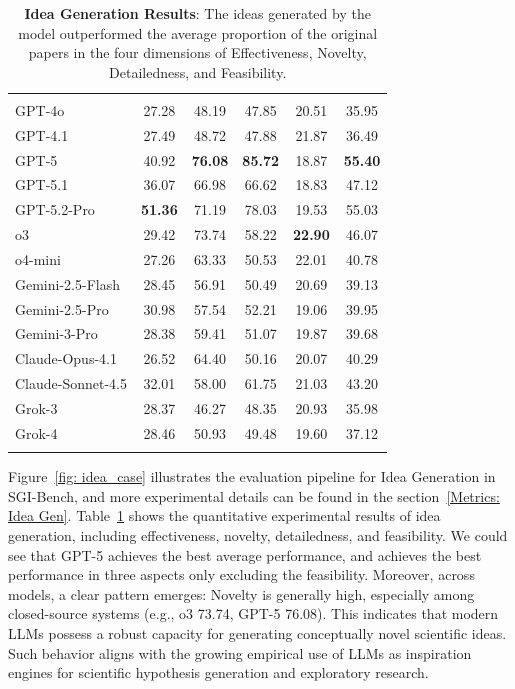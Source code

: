 \begin{table}[t]
{\begin{tabular}{lccccc}
\rowcolor{blue!5}\multicolumn{6}{c}{\emph{Closed-source LLM}} \\ \arrayrulecolor{black!30}\midrule
GPT-4o & 27.28 & 48.19 & 47.85 & 20.51 & 35.95 \\
GPT-4.1 & 27.49 & 48.72 & 47.88 & 21.87 & 36.49 \\
GPT-5 & 40.92 & \cellcolor{blue!10}\textbf{76.08} & \cellcolor{blue!10}\textbf{85.72} & 18.87 & \cellcolor{blue!10}\textbf{55.40} \\
GPT-5.1 & 36.07 & 66.98 & 66.62 & 18.83 & 47.12 \\
GPT-5.2-Pro & \cellcolor{blue!10}\textbf{51.36} & 71.19 & 78.03 & 19.53 & 55.03 \\
o3 & 29.42 & 73.74 & 58.22 & \cellcolor{blue!10}\textbf{22.90} & 46.07 \\
o4-mini & 27.26 & 63.33 & 50.53 & 22.01 & 40.78 \\
Gemini-2.5-Flash & 28.45 & 56.91 & 50.49 & 20.69 & 39.13 \\
Gemini-2.5-Pro & 30.98 & 57.54 & 52.21 & 19.06 & 39.95 \\
Gemini-3-Pro & 28.38 & 59.41 & 51.07 & 19.87 & 39.68 \\
Claude-Opus-4.1 & 26.52 & 64.40 & 50.16 & 20.07 & 40.29 \\
Claude-Sonnet-4.5 & 32.01 & 58.00 & 61.75 & 21.03 & 43.20 \\
Grok-3 & 28.37 & 46.27 & 48.35 & 20.93 & 35.98 \\
Grok-4 & 28.46 & 50.93 & 49.48 & 19.60 & 37.12 \\
\arrayrulecolor{black!100}\bottomrule
\end{tabular}
}
\caption{\textbf{Idea Generation Results}: The ideas generated by the model outperformed the average proportion of the original papers in the four dimensions of Effectiveness, Novelty, Detailedness, and Feasibility.}
\label{tab:idea_gen_res}
\end{table}

Figure~\ref{fig: idea_case} illustrates the evaluation pipeline for Idea Generation in SGI-Bench, and more experimental details can be found in the section~\ref{Metrics: Idea Gen}. Table~\ref{tab:idea_gen_res} shows the quantitative experimental results of idea generation, including effectiveness, novelty, detailedness, and feasibility. We could see that GPT-5 achieves the best average performance, and achieves the best performance in three aspects only excluding the feasibility. Moreover, across models, a clear pattern emerges: Novelty is generally high, especially among closed-source systems (e.g., o3 73.74, GPT-5 76.08). This indicates that modern LLMs possess a robust capacity for generating conceptually novel scientific ideas. Such behavior aligns with the growing empirical use of LLMs as inspiration engines for scientific hypothesis generation and exploratory research. 


